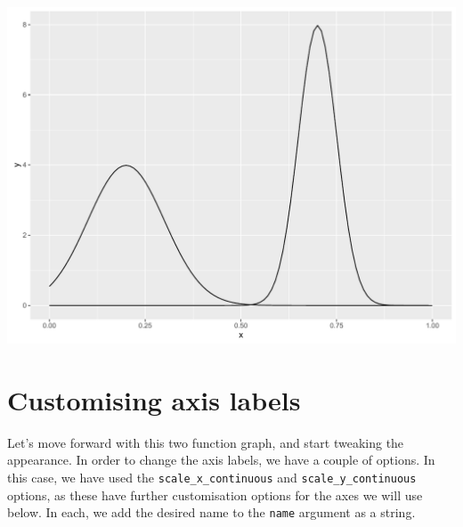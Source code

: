 \begin{Shaded}
\begin{Highlighting}[]
\StringTok{ }\NormalTok{(}\NormalTok{(} \NormalTok{(}\NormalTok{, }\NormalTok{)), }\NormalTok{(} 
\StringTok{      }\NormalTok{(}  \NormalTok{(}\NormalTok{, }\NormalTok{)) +}
\StringTok{      }\NormalTok{(}  \NormalTok{(}\NormalTok{, }\NormalTok{))}
\end{Highlighting}
\end{Shaded}

\begin{center}\includegraphics[width=0.55\linewidth]{figures/function_4-1} \end{center}

\section{Customising axis labels}\label{customising-axis-labels-2}

Let's move forward with this two function graph, and start tweaking the
appearance. In order to change the axis labels, we have a couple of
options. In this case, we have used the \texttt{scale\_x\_continuous}
and \texttt{scale\_y\_continuous} options, as these have further
customisation options for the axes we will use below. In each, we add
the desired name to the \texttt{name} argument as a string.

\begin{Shaded}
\begin{Highlighting}[]
\StringTok{ }\StringTok{ }\NormalTok{(} \NormalTok{) +}
\StringTok{      }\NormalTok{(} \NormalTok{)}
\end{Highlighting}
\end{Shaded}

